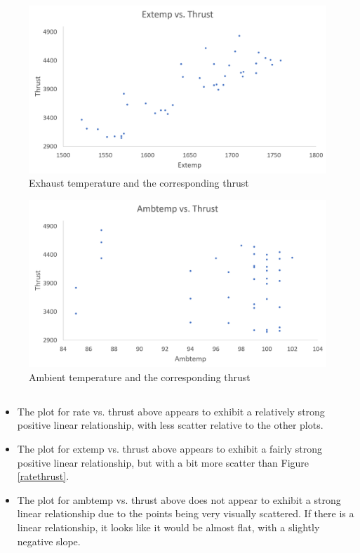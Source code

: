 \documentclass[letterpaper]{article}
\begin{document}
\begin{figure}[H]
 \centering
 \includegraphics[width=\textwidth]{extempthrust.png}
 \caption{Exhaust temperature and the corresponding thrust}
\end{figure}

\begin{figure}[H]
 \centering
 \includegraphics[width=\textwidth]{ambtempthrust.png}
 \caption{Ambient temperature and the corresponding thrust}
\end{figure}

\subsection{}
\label{1b}

\begin{itemize}
 \item The plot for rate vs. thrust above appears to exhibit a relatively strong positive
       linear relationship, with less scatter relative to the other plots.
 \item The plot for extemp vs. thrust above appears to exhibit a fairly strong positive
       linear relationship, but with a bit more scatter than Figure \ref{ratethrust}.
 \item The plot for ambtemp vs. thrust above does not appear to exhibit a strong linear
       relationship due to the points being very visually scattered.
       If there is a linear relationship, it looks like it would be almost flat,
       with a slightly negative slope.
\end{itemize}
\end{document}
